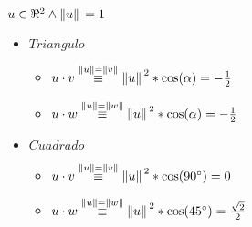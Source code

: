 \documentclass[../practica_01.tex]{subfiles}
\begin{document}
    $u \in \real^2 \wedge \norm*{u}=1$

    \begin{itemize}

        \item $Triangulo$
        
        \begin{itemize}

            \item $u \cdot v \stackrel{\norm*{u} = \norm*{v}}{\equiv} \norm*{u}^2 * \cos(\alpha) = -\frac{1}{2}$
                
            \item $u \cdot w \stackrel{\norm*{u} = \norm*{w}}{\equiv} \norm*{u}^2 * \cos(\alpha) = -\frac{1}{2}$

        \end{itemize}

        \item $Cuadrado$

        \begin{itemize}

            \item $u \cdot v \stackrel{\norm*{u} = \norm*{v}}{\equiv} \norm*{u}^2 * \cos(90^\circ) = 0$
                
            \item $u \cdot w \stackrel{\norm*{u} = \norm*{w}}{\equiv} \norm*{u}^2 * \cos(45^\circ) = \frac{\sqrt{2}}{2}$

        \end{itemize}

    \end{itemize}
\end{document}
